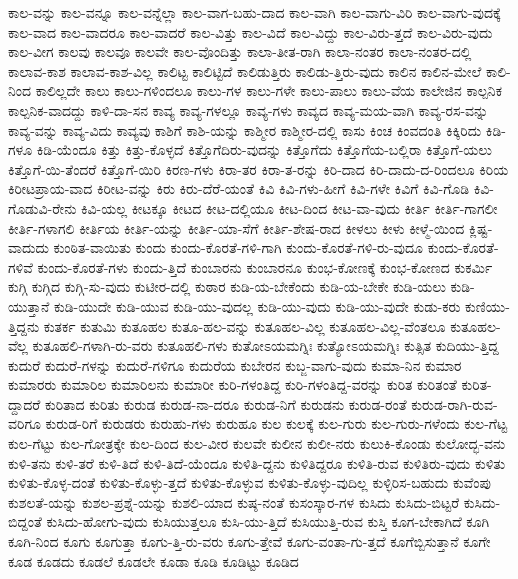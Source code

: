 {ಕಾಲ-ವನ್ನು
ಕಾಲ-ವನ್ನೂ
ಕಾಲ-ವನ್ನೆಲ್ಲಾ
ಕಾಲ-ವಾಗ-ಬಹು-ದಾದ
ಕಾಲ-ವಾಗಿ
ಕಾಲ-ವಾಗು-ವಿರಿ
ಕಾಲ-ವಾಗು-ವುದಕ್ಕೆ
ಕಾಲ-ವಾದ
ಕಾಲ-ವಾದರೂ
ಕಾಲ-ವಾದರೆ
ಕಾಲ-ವಿತ್ತು
ಕಾಲ-ವಿದೆ
ಕಾಲ-ವಿದ್ದು
ಕಾಲ-ವಿರು-ತ್ತದೆ
ಕಾಲ-ವಿರು-ವುದು
ಕಾಲ-ವೀಗ
ಕಾಲವು
ಕಾಲವೂ
ಕಾಲವೇ
ಕಾಲ-ವೊಂದಿತ್ತು
ಕಾಲಾ-ತೀತ-ರಾಗಿ
ಕಾಲಾ-ನಂತರ
ಕಾಲಾ-ನಂತರ-ದಲ್ಲಿ
ಕಾಲಾವ-ಕಾಶ
ಕಾಲಾವ-ಕಾಶ-ವಿಲ್ಲ
ಕಾಲಿಟ್ಟ
ಕಾಲಿಟ್ಟಿದೆ
ಕಾಲಿಡುತ್ತಿರು
ಕಾಲಿಡು-ತ್ತಿರು-ವುದು
ಕಾಲಿನ
ಕಾಲಿನ-ಮೇಲೆ
ಕಾಲಿ-ನಿಂದ
ಕಾಲಿಲ್ಲದೇ
ಕಾಲು
ಕಾಲು-ಗಳಿಂದಲೂ
ಕಾಲು-ಗಳ
ಕಾಲು-ಗಳೇ
ಕಾಲು-ಪಾಲು
ಕಾಲು-ವೆಯ
ಕಾಲೇಜಿನ
ಕಾಲ್ಪನಿಕ
ಕಾಲ್ಪನಿಕ-ವಾದದ್ದು
ಕಾಳಿ-ದಾ-ಸನ
ಕಾವ್ಯ
ಕಾವ್ಯ-ಗಳಲ್ಲೂ
ಕಾವ್ಯ-ಗಳು
ಕಾವ್ಯದ
ಕಾವ್ಯ-ಮಯ-ವಾಗಿ
ಕಾವ್ಯ-ರಸ-ವನ್ನು
ಕಾವ್ಯ-ವನ್ನು
ಕಾವ್ಯ-ವಿದು
ಕಾವ್ಯವು
ಕಾಶಿಗೆ
ಕಾಶಿ-ಯನ್ನು
ಕಾಶ್ಮೀರ
ಕಾಶ್ಮೀರ-ದಲ್ಲಿ
ಕಾಸು
ಕಿಂಚ
ಕಿಂವದಂತಿ
ಕಿಕ್ಕಿರಿದು
ಕಿಡಿ-ಗಳೂ
ಕಿಡಿ-ಯೆಂದೂ
ಕಿತ್ತು
ಕಿತ್ತು-ಕೊಳ್ಳದೆ
ಕಿತ್ತೊಗೆದಿರು-ವುದನ್ನು
ಕಿತ್ತೊಗೆದು
ಕಿತ್ತೊಗೆಯ-ಬಲ್ಲಿರಾ
ಕಿತ್ತೊಗೆ-ಯಲು
ಕಿತ್ತೊಗೆ-ಯಿ-ತೆಂದರೆ
ಕಿತ್ತೊಗೆ-ಯಿರಿ
ಕಿರಣ-ಗಳು
ಕಿರಾ-ತರ
ಕಿರಾ-ತ-ರನ್ನು
ಕಿರಿ-ದಾದ
ಕಿರಿ-ದಾದು-ದ-ರಿಂದಲೂ
ಕಿರಿಯ
ಕಿರೀಟಪ್ರಾಯ-ವಾದ
ಕಿರೀಟ-ವನ್ನು
ಕಿರು
ಕಿರು-ದೆರೆ-ಯಂತೆ
ಕಿವಿ
ಕಿವಿ-ಗಳು-ಹೀಗೆ
ಕಿವಿ-ಗಳೇ
ಕಿವಿಗೆ
ಕಿವಿ-ಗೊಡಿ
ಕಿವಿ-ಗೊಡುವಿ-ರೇನು
ಕಿವಿ-ಯಲ್ಲ
ಕೀಟಕ್ಕೂ
ಕೀಟದ
ಕೀಟ-ದಲ್ಲಿಯೂ
ಕೀಟ-ದಿಂದ
ಕೀಟ-ವಾ-ವುದು
ಕೀರ್ತಿ
ಕೀರ್ತಿ-ಗಾಗಲೀ
ಕೀರ್ತಿ-ಗಳಾಗಲಿ
ಕೀರ್ತಿಯ
ಕೀರ್ತಿ-ಯನ್ನು
ಕೀರ್ತಿ-ಯಾ-ಸೆಗೆ
ಕೀರ್ತಿ-ಶೇಷ-ರಾದ
ಕೀಳಲು
ಕೀಳು
ಕೀಳ್ಮೆ-ಯಿಂದ
ಕ್ಲಿಷ್ಟ-ವಾದುದು
ಕುಂಠಿತ-ವಾಯಿತು
ಕುಂದು
ಕುಂದು-ಕೊರತೆ-ಗಳಿ-ಗಾಗಿ
ಕುಂದು-ಕೊರತೆ-ಗಳಿ-ರು-ವುದೂ
ಕುಂದು-ಕೊರತೆ-ಗಳಿವೆ
ಕುಂದು-ಕೊರತೆ-ಗಳು
ಕುಂದು-ತ್ತಿದೆ
ಕುಂಬಾರನು
ಕುಂಬಾರನೂ
ಕುಂಭ-ಕೋಣಕ್ಕೆ
ಕುಂಭ-ಕೋಣದ
ಕುಕರ್ಮಿ
ಕುಗ್ಗಿ
ಕುಗ್ಗಿದ
ಕುಗ್ಗಿ-ಸು-ವುದು
ಕುಟೀರ-ದಲ್ಲಿ
ಕುಠಾರ
ಕುಡಿ-ಯ-ಬೇಕೆಂದು
ಕುಡಿ-ಯ-ಬೇಕೇ
ಕುಡಿ-ಯಲು
ಕುಡಿ-ಯುತ್ತಾನೆ
ಕುಡಿ-ಯುದೇ
ಕುಡಿ-ಯುವ
ಕುಡಿ-ಯು-ವುದಲ್ಲ
ಕುಡಿ-ಯು-ವುದು
ಕುಡಿ-ಯು-ವುದೇ
ಕುಡು-ಕರು
ಕುಣಿಯು-ತ್ತಿದ್ದನು
ಕುತರ್ಕ
ಕುತುಮಿ
ಕುತೂಹಲ
ಕುತೂ-ಹಲ-ವನ್ನು
ಕುತೂಹಲ-ವಿಲ್ಲ
ಕುತೂಹಲ-ವಿಲ್ಲ-ವೆಂತಲೂ
ಕುತೂಹಲ-ವೆಲ್ಲ
ಕುತೂಹಲಿ-ಗಳಾಗಿ-ರು-ವರು
ಕುತೂಹಲಿ-ಗಳು
ಕುತೋಽಯಮಗ್ನಿಃ
ಕುತ್ಯೋಽಯಮಗ್ನಿಃ
ಕುತ್ಸಿತ
ಕುದಿಯು-ತ್ತಿದ್ದ
ಕುದುರೆ
ಕುದುರೆ-ಗಳನ್ನು
ಕುದುರೆ-ಗಳಿಗೂ
ಕುದುರೆಯ
ಕುಬೇರನ
ಕುಬ್ಜ-ವಾಗು-ವುದು
ಕುಮಾ-ನಿನ
ಕುಮಾರ
ಕುಮಾರರು
ಕುಮಾರಿಲ
ಕುಮಾರಿಲನು
ಕುಮಾರೀ
ಕುರಿ-ಗಳಂತಿದ್ದ
ಕುರಿ-ಗಳಂತಿದ್ದ-ವರನ್ನು
ಕುರಿತ
ಕುರಿತಂತೆ
ಕುರಿತ-ದ್ದಾದರೆ
ಕುರಿತಾದ
ಕುರಿತು
ಕುರುಡ
ಕುರುಡ-ನಾ-ದರೂ
ಕುರುಡ-ನಿಗೆ
ಕುರುಡನು
ಕುರುಡ-ರಂತೆ
ಕುರುಡ-ರಾಗಿ-ರುವ-ವರಿಗೂ
ಕುರುಡ-ರಿಗೆ
ಕುರುಡರು
ಕುರುಹು-ಗಳು
ಕುರುಹೂ
ಕುಲ
ಕುಲಕ್ಕೆ
ಕುಲ-ಗುರು
ಕುಲ-ಗುರು-ಗಳೆಂದು
ಕುಲ-ಗೆಟ್ಟ
ಕುಲ-ಗೆಟ್ಟು
ಕುಲ-ಗೋತ್ರಕ್ಕೇ
ಕುಲ-ದಿಂದ
ಕುಲ-ವೀರ
ಕುಲವೇ
ಕುಲೀನ
ಕುಲೀ-ನರು
ಕುಲುಕಿ-ಕೊಂಡು
ಕುಲೋದ್ಭ-ವನು
ಕುಳಿ-ತನು
ಕುಳಿ-ತರೆ
ಕುಳಿ-ತಿದೆ
ಕುಳಿ-ತಿದೆ-ಯೆಂದೂ
ಕುಳಿತಿ-ದ್ದನು
ಕುಳಿತಿದ್ದರೂ
ಕುಳಿತಿ-ರುವ
ಕುಳಿತಿರು-ವುದು
ಕುಳಿತು
ಕುಳಿತು-ಕೊಳ್ಳ-ದಂತೆ
ಕುಳಿತು-ಕೊಳ್ಳು-ತ್ತದೆ
ಕುಳಿತು-ಕೊಳ್ಳುವ
ಕುಳಿತು-ಕೊಳ್ಳು-ವುದಿಲ್ಲ
ಕುಳ್ಳಿರಿಸ-ಬಹುದು
ಕುವೆಂಪು
ಕುಶಲತೆ-ಯನ್ನು
ಕುಶಲ-ಪ್ರಶ್ನೆ-ಯನ್ನು
ಕುಶಲಿ-ಯಾದ
ಕುಷ್ಠ-ನಂತೆ
ಕುಸಂಸ್ಕಾರ-ಗಳ
ಕುಸಿದು
ಕುಸಿದು-ಬಿಟ್ಟರೆ
ಕುಸಿದು-ಬಿದ್ದಂತೆ
ಕುಸಿದು-ಹೋಗು-ವುದು
ಕುಸಿಯುತ್ತಲೂ
ಕುಸಿ-ಯು-ತ್ತಿದೆ
ಕುಸಿಯುತ್ತಿ-ರುವ
ಕುಸ್ತಿ
ಕೂಗ-ಬೇಕಾಗಿದೆ
ಕೂಗಿ
ಕೂಗಿ-ನಿಂದ
ಕೂಗು
ಕೂಗುತ್ತಾ
ಕೂಗು-ತ್ತಿ-ರು-ವರು
ಕೂಗು-ತ್ತೇವೆ
ಕೂಗು-ವಂತಾ-ಗು-ತ್ತದೆ
ಕೂಗೆಬ್ಬಿಸುತ್ತಾನೆ
ಕೂಗೇ
ಕೂಡ
ಕೂಡದು
ಕೂಡಲೆ
ಕೂಡಲೇ
ಕೂಡಾ
ಕೂಡಿ
ಕೂಡಿಟ್ಟು
ಕೂಡಿದ
}
